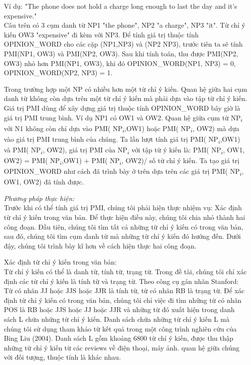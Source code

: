 \documentclass[12pt]{report}
\begin{document}
					\par Ví dụ: "The phone does not hold a charge long enough to last the day and it’s expensive."
					\\Câu trên có 3 cụm danh từ NP1 "the phone", NP2 "a charge", NP3 "it". Từ chỉ ý kiến OW3 "expensive" đi kèm với NP3. Để tính giá trị thuộc tính OPINION\_WORD cho các cặp (NP1,NP3) và (NP2 NP3), trước tiên ta sẽ tính PMI(NP1, OW3) và PMI(NP2, OW3). Sau khi tính toán, thu được PMI(NP2, OW3) nhỏ hơn PMI(NP1, OW3), khi đó OPINION\_WORD(NP1, NP3) = 0, OPINION\_WORD(NP2, NP3) = 1.
					\par Trong trường hợp một NP có nhiều hơn một từ chỉ ý kiến. Quan hệ giữa hai cụm danh từ không còn dựa trên một từ chỉ ý kiến mà phải dựa vào tập từ chỉ ý kiến. Giá trị PMI dùng để xây dựng giá trị thuộc tính OPINION\_WORD bây giờ là giá trị PMI trung bình. Ví dụ NP1 có OW1 và OW2. Quan hệ giữa cụm từ  NP\textsubscript{$i$} với N1 không còn chỉ dựa vào PMI( NP\textsubscript{$i$},OW1) hoặc PMI( NP\textsubscript{$i$}, OW2) mà dựa vào giá trị PMI trung bình của chúng. Ta lần lượt tính giá trị PMI( NP\textsubscript{$i$},OW1) và PMI( NP\textsubscript{$i$}, OW2), giá trị PMI của  NP\textsubscript{$i$} với tập từ ý kiến là:
					PMI( NP\textsubscript{$i$}, {OW1, OW2}) = PMI( NP\textsubscript{$i$},OW1) + PMI( NP\textsubscript{$i$}, OW2)/ số từ chỉ ý kiến. 
					Ta tạo giá trị OPINION\_WORD như cách đã trình bày ở trên dựa trên các giá trị PMI( NP\textsubscript{$i$}, {OW1, OW2}) đã tính được.
					\par \textit{Phương pháp thực hiện:}
					\\Trước khi có thể tính giá trị PMI, chúng tôi phải hiện thực nhiệm vụ: Xác định từ chỉ ý kiến trong văn bản. Để thực hiện điều này, chúng tôi chia nhỏ thành hai công đoạn. Đầu tiên, chúng tôi tìm tất cả những từ chỉ ý kiến có trong văn bản, sau đó, chúng tôi tìm cụm danh từ mà những từ chỉ ý kiến đó hướng đến. Dưới đậy, chúng tôi trình bày kĩ hơn về cách hiện thực hai công đoạn.
					\par Xác định từ chỉ ý kiến trong văn bản:
					\\Từ chỉ ý kiến có thể là danh từ, tính từ, trạng từ. Trong đề tài, chúng tôi chỉ xác định các từ chỉ ý kiến là tính từ và trạng từ. Theo công cụ gán nhãn Stanford: Từ có nhãn JJ hoặc JJS hoặc JJR là tính từ, từ có nhãn RB là trạng từ. Để xác định từ chỉ ý kiến có trong văn bản, chúng tôi chỉ việc đi tìm những từ có nhãn POS là RB hoặc JJS hoặc JJ hoặc JJR và những từ đó xuất hiện trong danh sách L chứa những từ chỉ ý kiến. Danh sách chứa những từ chỉ ý kiến L mà chúng tôi sử dụng tham khảo từ kết quả trong một công trình nghiên cứu của Bing Liu (2004)\cite{findfeatures1}. Danh sách L gồm khoảng 6800 từ chỉ ý kiến, được thu thập những từ chỉ ý kiến từ các reviews về điện thoại, máy ảnh. quan hệ giữa chúng với đối tượng, thuộc tính là khác nhau. 
\end{document}
